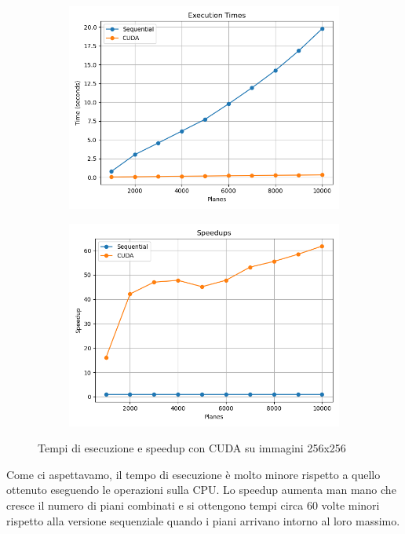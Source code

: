 \begin{figure}[H]
    \centering
    \begin{subfigure}{0.49\textwidth}
        \centering
        \includegraphics[width=\textwidth]{../results/plots/256/cuda_times}
    \end{subfigure}
    \begin{subfigure}{0.49\textwidth}
        \centering
        \includegraphics[width=\textwidth]{../results/plots/256/cuda_speedup}
    \end{subfigure}
    \caption{Tempi di esecuzione e speedup con CUDA su immagini 256x256}
    \label{fig:cuda_256}
\end{figure}
Come ci aspettavamo, il tempo di esecuzione è molto minore rispetto a quello ottenuto eseguendo le operazioni sulla CPU.
Lo speedup aumenta man mano che cresce il numero di piani combinati e si ottengono tempi circa 60 volte minori rispetto
alla versione sequenziale quando i piani arrivano intorno al loro massimo. \\

